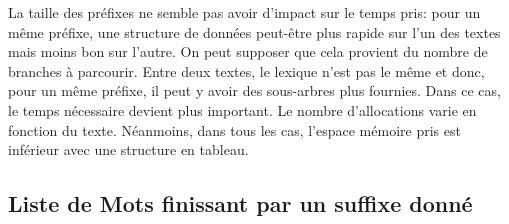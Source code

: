 \documentclass[a4paper,12pt]{article}
\begin{document}
La taille des préfixes ne semble pas avoir d'impact sur le temps pris: pour un même préfixe, une structure de données peut-être plus rapide sur l'un des textes mais moins bon sur l'autre.  
On peut supposer que cela provient du nombre de branches à parcourir. Entre deux textes, le lexique n'est pas le même et donc, pour un même préfixe, il peut y avoir des sous-arbres plus fournies. Dans ce cas, le temps nécessaire devient plus important.
Le nombre d'allocations varie en fonction du texte. Néanmoins, dans tous les cas, l'espace mémoire pris est inférieur avec une structure en tableau.



\subsection{Liste de Mots finissant par un suffixe donné}
\end{document}

